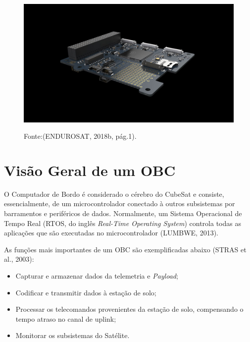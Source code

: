 \begin{itemize}
\begin{figure}[h]
	\includegraphics[keepaspectratio=true,scale=0.2]{figuras/Cubesat-OBC-module-1.jpg}
	
	Fonte:(ENDUROSAT, 2018b, pág.1).
	
	\label{fig11}
\end{figure}

\end{itemize}

\section{Visão Geral de um OBC}

O Computador de Bordo é considerado o cérebro do CubeSat e consiste, essencialmente, de um microcontrolador conectado à outros subsistemas por barramentos  e periféricos de dados. Normalmente, um Sistema Operacional de Tempo Real (RTOS, do inglês \textit{Real-Time Operating System}) controla todas as aplicações que são executadas no microcontrolador (LUMBWE, 2013).

As funções mais importantes de um OBC são exemplificadas abaixo (STRAS et al., 2003):

\begin{itemize}

\item Capturar e armazenar dados da telemetria e \textit{Payload};

\item Codificar e transmitir dados à estação de solo;

\item Processar os telecomandos provenientes da estação de solo, compensando o tempo atraso no canal de uplink;

\item Monitorar os subsistemas do Satélite.

\end{itemize}

